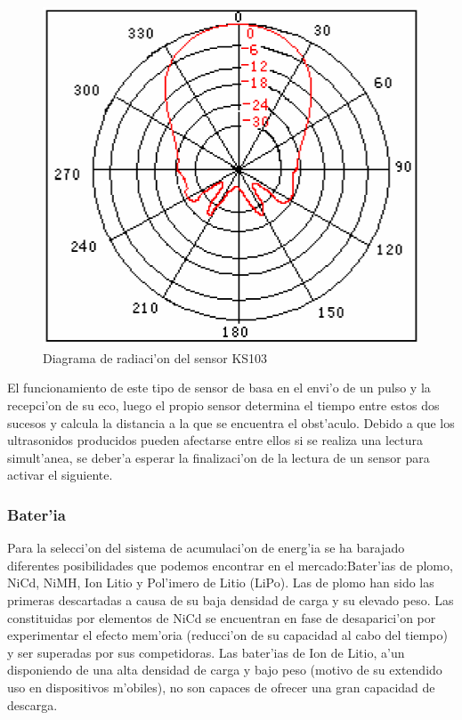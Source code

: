 \documentclass[twoside,12pt]{article}
\begin{document}
\begin{figure}[ht]
\centering
\includegraphics[scale=0.20]{images/KS103_diagram.png}
\caption{Diagrama de radiaci'on del sensor KS103}
\label{fig:KS103_diagram}
\end{figure} 

El funcionamiento de este tipo de sensor de basa en el envi'o de un pulso y la recepci'on de su eco, luego el propio sensor determina el tiempo entre estos dos sucesos y calcula la distancia a la que se encuentra el obst'aculo. Debido a que los ultrasonidos producidos pueden afectarse entre ellos si se realiza una lectura simult'anea, se deber'a esperar la finalizaci'on de la lectura de un sensor para activar el siguiente. 



\subsubsection{Bater'ia}
Para la selecci'on del sistema de acumulaci'on de energ'ia se ha barajado diferentes posibilidades que podemos encontrar en el mercado:Bater'ias de plomo, NiCd, NiMH, Ion Litio y Pol'imero de Litio (LiPo). Las de plomo han sido las primeras descartadas a causa de su baja densidad de carga y su elevado peso. Las constituidas por elementos de NiCd se encuentran en fase de desaparici'on por experimentar el efecto mem'oria (reducci'on de su capacidad al cabo del tiempo) y ser superadas por sus competidoras. Las bater'ias de Ion de Litio, a'un disponiendo de una alta densidad de carga y bajo peso (motivo de su extendido uso en dispositivos m'obiles), no son capaces de ofrecer una gran capacidad de descarga. \\
\end{document}
